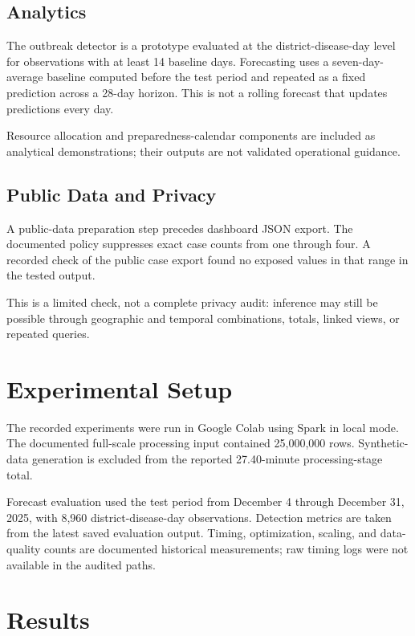 \documentclass[conference]{IEEEtran}
\begin{document}
\subsection{Analytics}

The outbreak detector is a prototype evaluated at the district-disease-day level for observations with at least 14 baseline days. Forecasting uses a seven-day-average baseline computed before the test period and repeated as a fixed prediction across a 28-day horizon. This is not a rolling forecast that updates predictions every day.

Resource allocation and preparedness-calendar components are included as analytical demonstrations; their outputs are not validated operational guidance.

\subsection{Public Data and Privacy}

A public-data preparation step precedes dashboard JSON export. The documented policy suppresses exact case counts from one through four. A recorded check of the public case export found no exposed values in that range in the tested output.

This is a limited check, not a complete privacy audit: inference may still be possible through geographic and temporal combinations, totals, linked views, or repeated queries.

\section{Experimental Setup}

The recorded experiments were run in Google Colab using Spark in local mode. The documented full-scale processing input contained 25,000,000 rows. Synthetic-data generation is excluded from the reported 27.40-minute processing-stage total.

Forecast evaluation used the test period from December 4 through December 31, 2025, with 8,960 district-disease-day observations. Detection metrics are taken from the latest saved evaluation output. Timing, optimization, scaling, and data-quality counts are documented historical measurements; raw timing logs were not available in the audited paths.

\section{Results}
\end{document}
